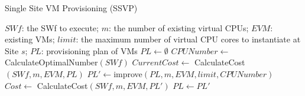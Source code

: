 \begin{algorithm}[ht]
\caption{Single Site VM Provisioning (SSVP)}\label{alg:PSSVP}
\begin{algorithmic}[1]
\INPUT $SWf$: the SWf to execute; $m$: the number of existing virtual CPUs; $EVM$: existing VMs; $limit$: the maximum number of virtual CPU cores to instantiate at Site $s$;
\OUTPUT $PL$: provisioning plan of VMs
\BEGIN
\State $PL\gets \emptyset$
\State $CPUNumber \gets$ CalculateOptimalNumber$( SWf )$
\Do
\State $CurrentCost \gets$ CalculateCost$( SWf, m, EVM, PL )$
\State $PL' \gets $improve$(PL, m, EVM, limit, CPUNumber)$
\State $Cost \gets$ CalculateCost$( SWf, m, EVM, PL' )$
\State $PL \gets PL'$
\EndIf
{}
\ENDBEGIN
\end{algorithmic}
\end{algorithm}

